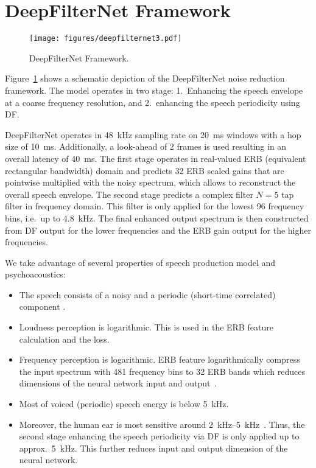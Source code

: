 \documentclass{INTERSPEECH2023}
\begin{document}
\section{DeepFilterNet Framework}
\vspace{-.2em}
\label{sec:framework}
\begin{figure}
  \texttt{[image: figures/deepfilternet3.pdf]}
  \caption{DeepFilterNet Framework.}
  \label{fig:DeepFilterNet}
  \vspace{-.7em}
\end{figure}

Figure~\ref{fig:DeepFilterNet} shows a schematic depiction of the DeepFilterNet noise reduction framework.
The model operates in two stage: 1.~Enhancing the speech envelope at a coarse frequency resolution, and 2.~enhancing the speech periodicity using DF.

DeepFilterNet operates in \SI{48}{kHz} sampling rate on \SI{20}{\ms} windows with a hop size of \SI{10}{\ms}.
Additionally, a look-ahead of 2 frames is used resulting in an overall latency of \SI{40}{\ms}.
The first stage operates in real-valued ERB (equivalent rectangular bandwidth) domain and predicts 32 ERB scaled gains that are pointwise multiplied with the noisy spectrum, which allows to reconstruct the overall speech envelope.
The second stage predicts a complex filter $N=5$ tap filter in frequency domain.
This filter is only applied for the lowest 96 frequency bins, i.e.~up to \SI{4.8}{\kHz}.
The final enhanced output spectrum is then constructed from DF output for the lower frequencies and the ERB gain output for the higher frequencies.

We take advantage of several properties of speech production model and psychoacoustics:
\begin{itemize}
  \item The speech consists of a noisy and a periodic (short-time correlated) component \cite{quatieri2002discrete}.
  \item Loudness perception is logarithmic.
    This is used in the ERB feature calculation and the loss.
      \item Frequency perception is logarithmic.
    ERB feature logarithmically compress the input spectrum with 481 frequency bins to 32 ERB bands which reduces dimensions of the neural network input and output~\cite{moore1988comparison}.
  \item Most of voiced (periodic) speech energy is below \SI{5}{\kHz}.
  \item Moreover, the human ear is most sensitive around \SIrange{2}{5}{\kHz}~\cite{suzuki2004equal}.
    Thus, the second stage enhancing the speech periodicity via DF is only applied up to approx.~\SI{5}{\kHz}.
    This further reduces input and output dimension of the neural network.
\end{itemize}
\end{document}
